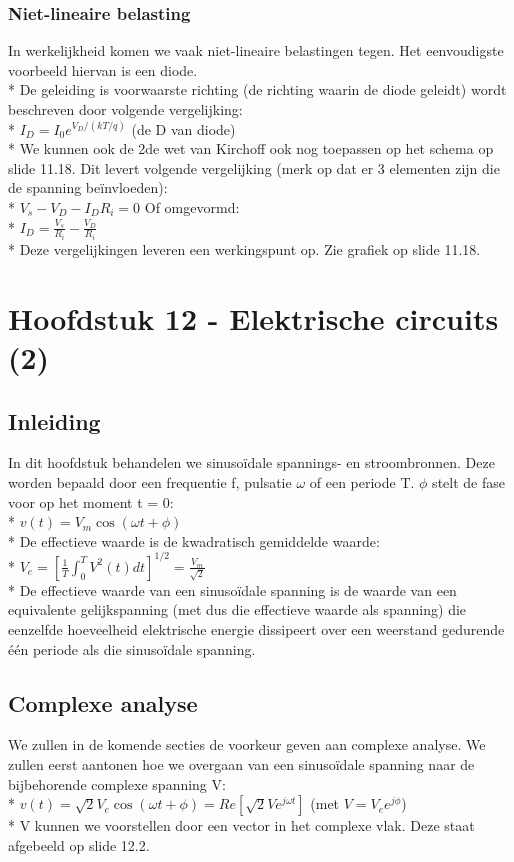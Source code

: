 \documentclass[10pt]{article}
\begin{document}
\subsubsection{Niet-lineaire belasting}
In werkelijkheid komen we vaak niet-lineaire belastingen tegen. Het eenvoudigste voorbeeld hiervan is een diode.\\*
De geleiding is voorwaarste richting (de richting waarin de diode geleidt) wordt beschreven door volgende vergelijking:\\*
$I_D = I_0e^{V_D/(kT/q)}$ {\scriptsize (de D van diode)}\\*
We kunnen ook de 2de wet van Kirchoff ook nog toepassen op het schema op slide 11.18. Dit levert volgende vergelijking (merk op dat er 3 elementen zijn die de spanning be\"invloeden):\\*
$V_s - V_D - I_DR_i = 0$ Of omgevormd:\\*
$I_D = \frac{V_s}{R_i} - \frac{V_D}{R_i}$\\*
Deze vergelijkingen leveren een werkingspunt op. Zie grafiek op slide 11.18.
\section{Hoofdstuk 12 - Elektrische circuits (2)}
\subsection{Inleiding}
In dit hoofdstuk behandelen we sinuso\"idale spannings- en stroombronnen. Deze worden bepaald door een frequentie f, pulsatie $\omega$ of een periode T. $\phi$ stelt de fase voor op het moment t = 0:\\*
$v(t) = V_m\cos{(\omega t+\phi)}$\\*
De effectieve waarde is de kwadratisch gemiddelde waarde:\\*
$V_e = \left[\frac{1}{T}\int_0^TV^2(t)dt\right]^{1/2} = \frac{V_m}{\sqrt{2}}$\\*
De effectieve waarde van een sinuso\"idale spanning is de waarde van een equivalente gelijkspanning (met dus die effectieve waarde als spanning) die eenzelfde hoeveelheid elektrische energie dissipeert over een weerstand gedurende \'e\'en periode als die sinuso\"idale spanning.
\subsection{Complexe analyse}
We zullen in de komende secties de voorkeur geven aan complexe analyse. We zullen eerst aantonen hoe we overgaan van een sinuso\"idale spanning naar de bijbehorende complexe spanning V:\\*
$v(t) = \sqrt{2}V_e\cos{(\omega t + \phi)} = Re\left[\sqrt{2}Ve^{j\omega t}\right]$ (met $V = V_ee^{j\phi}$)\\*
V kunnen we voorstellen door een vector in het complexe vlak. Deze staat afgebeeld op slide 12.2.
\end{document}
